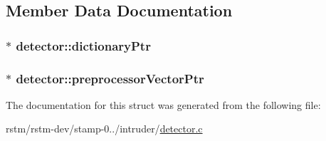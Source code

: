\subsection{Member Data Documentation}
\hypertarget{structdetector_afc48752bc3fb227fca35630a5113cb07}{
\subsubsection[{dictionary\-Ptr}]{$\ast$ detector\-::dictionary\-Ptr}}\label{structdetector_afc48752bc3fb227fca35630a5113cb07}
\hypertarget{structdetector_af89702c68d05dc14b1f6c83c6a5a59f1}{
\subsubsection[{preprocessor\-Vector\-Ptr}]{$\ast$ detector\-::preprocessor\-Vector\-Ptr}}\label{structdetector_af89702c68d05dc14b1f6c83c6a5a59f1}


The documentation for this struct was generated from the following file\-:\begin{DoxyCompactItemize}
\item 
rstm/rstm-\/dev/stamp-\/0../intruder/\hyperlink{detector_8c}{detector.\-c}\end{DoxyCompactItemize}
